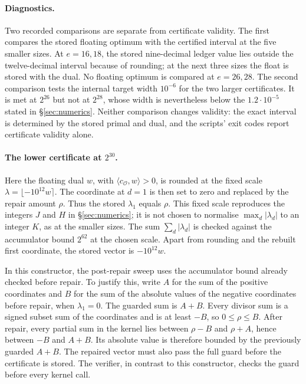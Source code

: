 \documentclass[11pt,a4paper]{article}
\theoremstyle{plain}
\theoremstyle{definition}
\theoremstyle{remark}
\newcommand{\vR}{\mathcal{O}}
\begin{document}
\paragraph{Diagnostics.}
Two recorded comparisons are separate from certificate validity. The first compares the stored
floating optimum with the certified interval at the five smaller sizes. At $e=16,18$, the stored
nine-decimal ledger value lies outside the twelve-decimal interval because of rounding; at the next
three sizes the float is stored with the dual. No floating optimum is compared at $e=26,28$.
The second comparison tests the internal target width $10^{-6}$ for the two larger certificates.
It is met at $2^{26}$ but not at $2^{28}$, whose width is nevertheless below the $1.2\cdot10^{-5}$ stated in \S\ref{sec:numerics}.
Neither comparison changes validity: the exact interval is determined by the stored primal and dual,
and the scripts' exit codes report certificate validity alone.

\paragraph{The lower certificate at $2^{30}$.}
Here the floating dual $w$, with $\langle c_{\vR},w\rangle>0$, is rounded at the fixed scale
$\lambda=\lfloor-10^{12}w\rceil$. The coordinate at $d=1$ is then set to zero and replaced by the
repair amount $\rho$. Thus the stored $\lambda_1$ equals $\rho$.
This fixed scale reproduces the integers $J$ and $H$ in \S\ref{sec:numerics}; it is not chosen to
normalise $\max_d|\lambda_d|$ to an integer $K$, as at the smaller sizes.
The sum $\sum_d|\lambda_d|$ is checked against the accumulator bound $2^{62}$ at the chosen scale.
Apart from rounding and the rebuilt first coordinate, the stored vector is $-10^{12}w$.

In this constructor, the post-repair sweep uses the accumulator bound already checked before repair.
To justify this, write $A$ for the sum of the positive coordinates and $B$ for the sum of the absolute
values of the negative coordinates before repair, when $\lambda_1=0$.
The guarded sum is $A+B$. Every divisor sum is a signed subset sum of the coordinates and is at least
$-B$, so $0\le\rho\le B$. After repair, every partial sum in the kernel lies between
$\rho-B$ and $\rho+A$, hence between $-B$ and $A+B$.
Its absolute value is therefore bounded by the previously guarded $A+B$.
The repaired vector must also pass the full guard before the certificate is stored.
The verifier, in contrast to this constructor, checks the guard before every kernel call.
\end{document}
